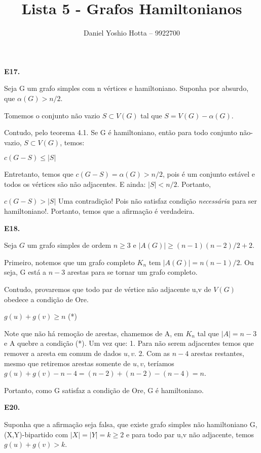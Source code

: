 \documentclass{article}
\begin{document}
	
	\title{Lista 5 - Grafos Hamiltonianos}
	\author{Daniel Yoshio Hotta – 9922700}
	
	\maketitle
	
	\textbf {E17.} 
	
	Seja G um grafo simples com n vértices e hamiltoniano. Suponha por absurdo, que $\alpha (G) > n/2$.
	
	Tomemos o conjunto não vazio $S \subset V(G)$ tal que $S = V(G) - \alpha(G)$.
	
	Contudo, pelo teorema 4.1. Se G é hamiltoniano, então para todo conjunto não-vazio, $S \subset V(G)$, temos:
	
	$c(G - S) \leq |S|$
	
	Entretanto, temos que $c(G-S) = \alpha(G) > n/2$, pois é um conjunto estável e todos os vértices são não adjacentes.
	E ainda: $|S| < n/2$.
	Portanto,
	
	$c(G-S) > |S|$
	Uma contradição! Pois não satisfaz condição \textit {necessária} para ser hamiltoniano!.
	Portanto, temos que a afirmação é verdadeira.
	
	\textbf {E18.} 
	
	Seja $G$ um grafo simples de ordem $n \geq 3$ e $|A(G)| \geq (n-1) (n-2)/2 + 2$. 
	
	Primeiro, notemos que um grafo completo $K_n$ tem $|A(G)| = n (n-1)/2$. Ou seja, G está a $n - 3$ arestas para se tornar um grafo completo.
	
	Contudo, provaremos que todo par de vértice não adjacente u,v de $V(G)$ obedece a condição de Ore.
	
	$g(u)  +g(v) \geq n$   (*)
	
	Note que não há remoção de arestas, chamemos de A, em $K_n$ tal que $|A| = n-3$ e A quebre a condição (*). Um vez que:
	1. Para não serem adjacentes temos que remover a aresta em comum de dados $u,v$.
	2. Com as $n-4$ arestas restantes, mesmo que retiremos arestas somente de $u,v$, teríamos $g(u) + g(v) - n-4 = (n-2) + (n-2) - (n-4) = n$.
	
	Portanto, como G satisfaz a condição de Ore, G é hamiltoniano.
	
	\textbf {E20.} 
	
	Suponha que a afirmação seja falsa, que existe grafo simples não hamiltoniano G, (X,Y)-bipartido com $|X|=|Y|=k \geq 2$ e para todo par u,v não adjacente, temos $g(u) + g(v) > k$.
	
\end{document}

